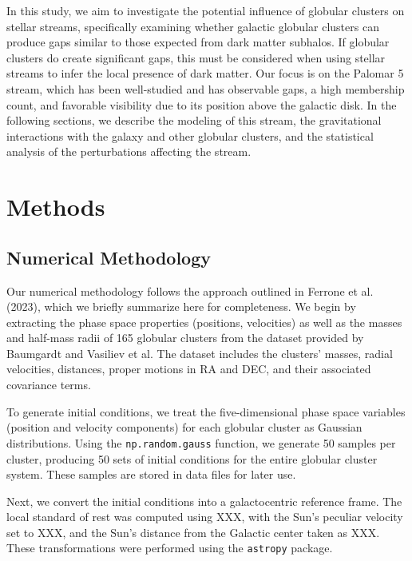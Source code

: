 \documentclass[draft]{aa}
\begin{document}
  In this study, we aim to investigate the potential influence of globular clusters on stellar streams, specifically examining whether galactic globular clusters can produce gaps similar to those expected from dark matter subhalos. If globular clusters do create significant gaps, this must be considered when using stellar streams to infer the local presence of dark matter. Our focus is on the Palomar 5 stream, which has been well-studied and has observable gaps, a high membership count, and favorable visibility due to its position above the galactic disk. In the following sections, we describe the modeling of this stream, the gravitational interactions with the galaxy and other globular clusters, and the statistical analysis of the perturbations affecting the stream.













\section{Methods}



  \subsection{Numerical Methodology}
    Our numerical methodology follows the approach outlined in Ferrone et al. (2023), which we briefly summarize here for completeness. We begin by extracting the phase space properties (positions, velocities) as well as the masses and half-mass radii of 165 globular clusters from the dataset provided by Baumgardt and Vasiliev et al. The dataset includes the clusters' masses, radial velocities, distances, proper motions in RA and DEC, and their associated covariance terms.

    To generate initial conditions, we treat the five-dimensional phase space variables (position and velocity components) for each globular cluster as Gaussian distributions. Using the \texttt{np.random.gauss} function, we generate 50 samples per cluster, producing 50 sets of initial conditions for the entire globular cluster system. These samples are stored in data files for later use.

    Next, we convert the initial conditions into a galactocentric reference frame. The local standard of rest was computed using XXX, with the Sun's peculiar velocity set to XXX, and the Sun's distance from the Galactic center taken as XXX. These transformations were performed using the \texttt{astropy} package.
\end{document}
